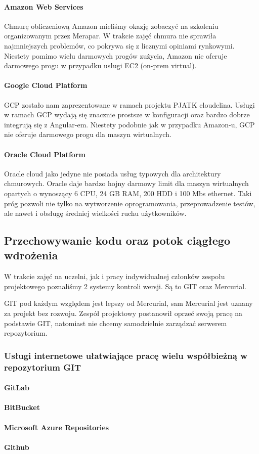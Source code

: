\paragraph{Amazon Web Services}
Chmurę obliczeniową Amazon mieliśmy okazję zobaczyć na szkoleniu organizowanym przez Merapar.
W trakcie zajęć chmura nie sprawiła najmniejszych problemów, co pokrywa się z licznymi opiniami rynkowymi.
Niestety pomimo wielu darmowych progów zużycia, Amazon nie oferuje darmowego progu w przypadku usługi EC2 (\gls{on-prem} virtual).

\paragraph{Google Cloud Platform}
GCP zostało nam zaprezentowane w ramach projektu PJATK cloudelina.
Usługi w ramach GCP wydają się znacznie prostsze w konfiguracji oraz bardzo dobrze integrują się z Angular-em.
Niestety podobnie jak w przypadku Amazon-u, GCP nie oferuje darmowego progu dla maszyn wirtualnych.

\paragraph{Oracle Cloud Platform}
Oracle cloud jako jedyne nie posiada usług typowych dla architektury chmurowych.
Oracle daje bardzo hojny darmowy limit dla maszyn wirtualnych opartych o  wynoszący 6 CPU, 24 GB RAM, 200 HDD i 100 Mbs ethernet.
Taki próg pozwoli nie tylko na wytworzenie oprogramowania, przeprowadzenie testów, ale nawet i obsługę średniej wielkości ruchu użytkowników.

\subsection{Przechowywanie kodu oraz potok ciągłego wdrożenia}
\label{subsec:przechowywanie-kodu-oraz-potok-ciagego-wdrozenia}

W trakcie zajęć na uczelni, jak i pracy indywidualnej członków zespołu projektowego poznaliśmy 2 systemy kontroli wersji.
Są to GIT oraz Mercurial.

GIT pod każdym względem jest lepszy od Mercurial, sam Mercurial jest uznany za projekt bez rozwoju.
Zespół projektowy postanowił oprzeć swoją pracę na podstawie GIT, natomiast nie chcemy samodzielnie zarządzać serwerem repozytorium.

\subsubsection{Usługi internetowe ułatwiające pracę wielu współbieżną w repozytorium GIT}
\paragraph{GitLab}
\paragraph{BitBucket}
\paragraph{Microsoft Azure Repositories}
\paragraph{Github}

